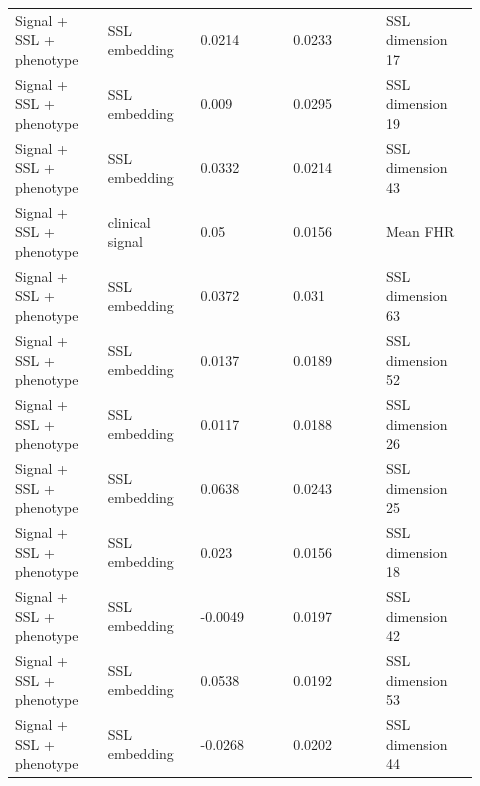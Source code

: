 \documentclass[11pt]{article}
\begin{document}
\begin{landscape}
\begin{longtable}{L{0.184\linewidth} L{0.184\linewidth} L{0.184\linewidth} L{0.184\linewidth} L{0.184\linewidth}}
Signal + SSL + phenotype & SSL embedding & 0.\allowbreak{}0214 & 0.\allowbreak{}0233 & SSL dimension 17 \\
Signal + SSL + phenotype & SSL embedding & 0.\allowbreak{}009 & 0.\allowbreak{}0295 & SSL dimension 19 \\
Signal + SSL + phenotype & SSL embedding & 0.\allowbreak{}0332 & 0.\allowbreak{}0214 & SSL dimension 43 \\
Signal + SSL + phenotype & clinical signal & 0.\allowbreak{}05 & 0.\allowbreak{}0156 & Mean FHR \\
Signal + SSL + phenotype & SSL embedding & 0.\allowbreak{}0372 & 0.\allowbreak{}031 & SSL dimension 63 \\
Signal + SSL + phenotype & SSL embedding & 0.\allowbreak{}0137 & 0.\allowbreak{}0189 & SSL dimension 52 \\
Signal + SSL + phenotype & SSL embedding & 0.\allowbreak{}0117 & 0.\allowbreak{}0188 & SSL dimension 26 \\
Signal + SSL + phenotype & SSL embedding & 0.\allowbreak{}0638 & 0.\allowbreak{}0243 & SSL dimension 25 \\
Signal + SSL + phenotype & SSL embedding & 0.\allowbreak{}023 & 0.\allowbreak{}0156 & SSL dimension 18 \\
Signal + SSL + phenotype & SSL embedding & -\allowbreak{}0.\allowbreak{}0049 & 0.\allowbreak{}0197 & SSL dimension 42 \\
Signal + SSL + phenotype & SSL embedding & 0.\allowbreak{}0538 & 0.\allowbreak{}0192 & SSL dimension 53 \\
Signal + SSL + phenotype & SSL embedding & -\allowbreak{}0.\allowbreak{}0268 & 0.\allowbreak{}0202 & SSL dimension 44 \\
\end{longtable}
\normalsize
\end{landscape}
\end{document}
